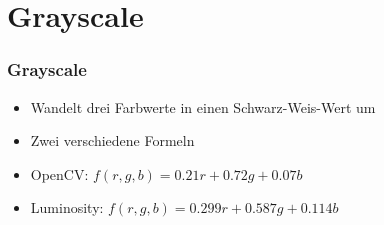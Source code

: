 
\section{Grayscale}

\begin{frame}
    \frametitle{Grayscale}

    \begin{itemize}
        \item Wandelt drei Farbwerte in einen Schwarz-Weis-Wert um \pause
        \item Zwei verschiedene Formeln \pause
        \item OpenCV: $ f(r, g, b) = 0.21r + 0.72g + 0.07b $  \pause
        \item Luminosity: $ f(r, g, b) =  0.299r + 0.587g + 0.114b $ \pause
    \end{itemize}
\end{frame}


